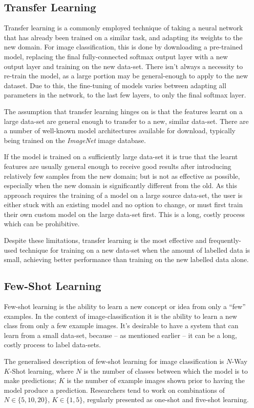 \documentclass{report}
\begin{document}
	\subsection{Transfer Learning}
	Transfer learning is a commonly employed technique of taking a neural network that has already been trained on a similar task, and adapting its weights to the new domain. For image classification, this is done by downloading a pre-trained model, replacing the final fully-connected softmax output layer with a new output layer and training on the new data-set. There isn't always a necessity to re-train the model, as a large portion may be general-enough to apply to the new dataset. Due to this, the fine-tuning of models varies between adapting all parameters in the network, to the last few layers, to only the final softmax layer.  \par
	The assumption that transfer learning hinges on is that the features learnt on a large data-set are general enough to transfer to a new, similar data-set. There are a number of well-known model architectures available for download, typically being trained on the \textit{ImageNet} image database. \par
	If the model is trained on a sufficiently large data-set it is true that the learnt features are usually general enough to receive good results after introducing relatively few samples from the new domain; but is not as effective as possible, especially when the new domain is significantly different from the old. As this approach requires the training of a model on a large source data-set, the user is either stuck with an existing model and no option to change, or must first train their own custom model on the large data-set first. This is a long, costly process which can be prohibitive. \par
	Despite these limitations, transfer learning is the most effective and frequently-used technique for training on a new data-set when the amount of labelled data is small, achieving better performance than training on the new labelled data alone. \par 

	\subsection{Few-Shot Learning}
	Few-shot learning is the ability to learn a new concept or idea from only a ``few'' examples. In the context of image-classification it is the ability to learn a new class from only a few example images. It's desirable to have a system that can learn from a small data-set, because -- as mentioned earlier -- it can be a long, costly process to label data-sets. \par
	The generalised description of few-shot learning for image classification is $N$-Way $K$-Shot learning, where $N$ is the number of classes between which the model is to make predictions; $K$ is the number of example images shown prior to having the model produce a prediction. Researchers tend to work on combinations of $N \in \{5, 10, 20\}$, $K \in \{1, 5\}$, regularly presented as one-shot and five-shot learning.
	
\end{document}
